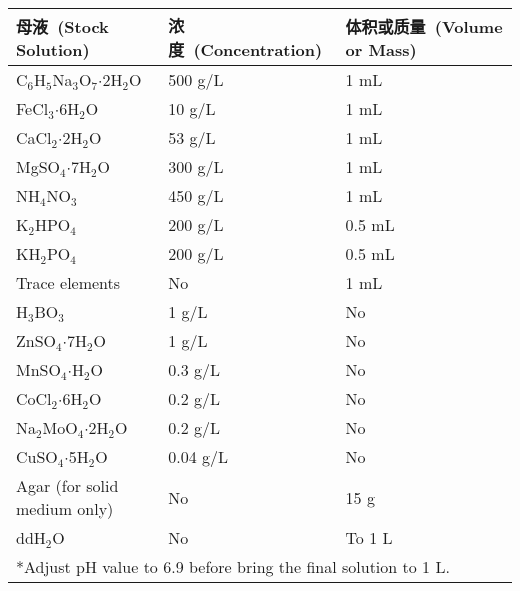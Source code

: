 \vfill

\begin{table}[htbp]
\small
\centering
{
\par}
\begin{tabular*}{\textwidth}[c]{@{\extracolsep{\fill}}lll}
\toprule
母液\ (Stock Solution) & 浓度\ (Concentration)     & 体积或质量\ (Volume or Mass)\\
\midrule
C$_6$H$_5$Na$_3$O$_7$$\cdot$2H$_2$O& 500 g/L  &1 mL       \\
 FeCl$_3$$\cdot$6H$_2$O             &10 g/L    &1 mL       \\
 CaCl$_2$$\cdot$2H$_2$O             & 53 g/L   &1 mL       \\
 MgSO$_4$$\cdot$7H$_2$O             & 300 g/L  &1 mL       \\
 NH$_4$NO$_3$                       & 450 g/L  &1 mL       \\
K$_2$HPO$_4$                       & 200 g/L  &0.5 mL     \\
 KH$_2$PO$_4$                       & 200 g/L  &0.5 mL     \\
 Trace elements                     & No       &1 mL       \\
 H$_3$BO$_3$                        & 1 g/L    &No         \\
 ZnSO$_4$$\cdot$7H$_2$O             & 1 g/L    &No         \\
 MnSO$_4$$\cdot$H$_2$O              & 0.3 g/L  &No         \\
 CoCl$_2$$\cdot$6H$_2$O             & 0.2 g/L  &No         \\
Na$_2$MoO$_4$$\cdot$2H$_2$O        & 0.2 g/L  &No         \\
CuSO$_4$$\cdot$5H$_2$O             & 0.04 g/L &No         \\
 Agar (for solid medium only)       & No       & 15 g      \\
 ddH$_2$O                           & No       & To 1 L    \\
\bottomrule
\multicolumn{3}{l}{*Adjust pH value to 6.9 before bring the final solution to 1 L.}
\end{tabular*}
\end{table}


